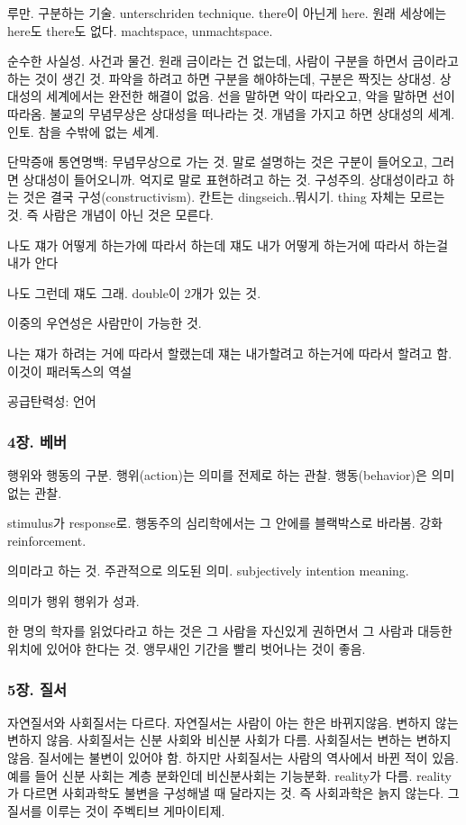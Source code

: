 \documentclass[11pt, a4paper]{article}
\begin{document}
루만. 구분하는 기술. unterschriden technique. there이 아닌게 here. 원래 세상에는 here도 there도 없다. machtspace, unmachtspace. 

순수한 사실성. 사건과 물건. 원래 금이라는 건 없는데, 사람이 구분을 하면서 금이라고 하는 것이 생긴 것. 파악을 하려고 하면 구분을 해야하는데, 구분은 짝짓는 상대성. 상대성의 세계에서는 완전한 해결이 없음. 선을 말하면 악이 따라오고, 악을 말하면 선이 따라옴. 불교의 무념무상은 상대성을 떠나라는 것. 개념을 가지고 하면 상대성의 세계. 인토. 참을 수밖에 없는 세계.

단막증애 통연명백: 무념무상으로 가는 것. 말로 설명하는 것은 구분이 들어오고, 그러면 상대성이 들어오니까. 억지로 말로 표현하려고 하는 것. 구성주의. 상대성이라고 하는 것은 결국 구성(constructivism). 칸트는 dingseich..뭐시기. thing 자체는 모르는 것. 즉 사람은 개념이 아닌 것은 모른다.

나도 쟤가 어떻게 하는가에 따라서 하는데 쟤도 내가 어떻게 하는거에 따라서 하는걸 내가 안다

나도 그런데 쟤도 그래. double이 2개가 있는 것.

이중의 우연성은 사람만이 가능한 것. 

나는 쟤가 하려는 거에 따라서 할랬는데 쟤는 내가할려고 하는거에 따라서 할려고 함. 이것이 패러독스의 역설

공급탄력성: 언어

\subsubsection{4장. 베버}

행위와 행동의 구분. 행위(action)는 의미를 전제로 하는 관찰. 행동(behavior)은 의미 없는 관찰.

stimulus가 response로. 행동주의 심리학에서는 그 안에를 블랙박스로 바라봄. 강화 reinforcement. 

의미라고 하는 것. 주관적으로 의도된 의미. subjectively intention meaning. 

의미가 행위 행위가 성과.

한 명의 학자를 읽었다라고 하는 것은 그 사람을 자신있게 권하면서 그 사람과 대등한 위치에 있어야 한다는 것. 앵무새인 기간을 빨리 벗어나는 것이 좋음. 




\subsubsection{5장. 질서}
자연질서와 사회질서는 다르다. 자연질서는 사람이 아는 한은 바뀌지않음. 변하지 않는 변하지 않음. 사회질서는 신분 사회와 비신분 사회가 다름. 사회질서는 변하는 변하지 않음. 질서에는 불변이 있어야 함. 하지만 사회질서는 사람의 역사에서 바뀐 적이 있음. 예를 들어 신분 사회는 계층 분화인데 비신분사회는 기능분화. reality가 다름. reality가 다르면 사회과학도 불변을 구성해낼 때 달라지는 것. 즉 사회과학은 늙지 않는다. 그 질서를 이루는 것이 주벡티브 게마이티제.
\end{document}
